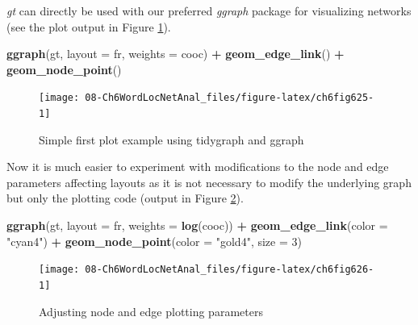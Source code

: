 \documentclass[
]{article}
\newenvironment{Shaded}{\begin{snugshade}}{\end{snugshade}}
\newcommand{\AttributeTok}[1]{\textcolor[rgb]{0.13,0.29,0.53}{#1}}
\newcommand{\DecValTok}[1]{\textcolor[rgb]{0.00,0.00,0.81}{#1}}
\newcommand{\FunctionTok}[1]{\textcolor[rgb]{0.13,0.29,0.53}{\textbf{#1}}}
\newcommand{\NormalTok}[1]{#1}
\newcommand{\SpecialCharTok}[1]{\textcolor[rgb]{0.81,0.36,0.00}{\textbf{#1}}}
\newcommand{\StringTok}[1]{\textcolor[rgb]{0.31,0.60,0.02}{#1}}
\begin{document}
\emph{gt} can directly be used with our preferred \emph{ggraph} package for visualizing networks (see the plot output in Figure \ref{fig:ch6fig625}).

\begin{Shaded}
\begin{Highlighting}[]
\FunctionTok{ggraph}\NormalTok{(gt, }\AttributeTok{layout =} \StringTok{\textquotesingle{}fr\textquotesingle{}}\NormalTok{, }\AttributeTok{weights =}\NormalTok{ cooc) }\SpecialCharTok{+} 
  \FunctionTok{geom\_edge\_link}\NormalTok{() }\SpecialCharTok{+} 
  \FunctionTok{geom\_node\_point}\NormalTok{()}
\end{Highlighting}
\end{Shaded}

\begin{figure}

{\centering \texttt{[image: 08-Ch6WordLocNetAnal\_files/figure-latex/ch6fig625-1]} 

}

\caption{Simple first plot example using tidygraph and ggraph}\label{fig:ch6fig625}
\end{figure}

Now it is much easier to experiment with modifications to the node and edge parameters affecting layouts as it is not necessary to modify the underlying graph but only the plotting code (output in Figure \ref{fig:ch6fig626}).

\begin{Shaded}
\begin{Highlighting}[]
\FunctionTok{ggraph}\NormalTok{(gt, }\AttributeTok{layout =} \StringTok{\textquotesingle{}fr\textquotesingle{}}\NormalTok{, }\AttributeTok{weights =} \FunctionTok{log}\NormalTok{(cooc)) }\SpecialCharTok{+} 
  \FunctionTok{geom\_edge\_link}\NormalTok{(}\AttributeTok{color =} \StringTok{"cyan4"}\NormalTok{) }\SpecialCharTok{+} 
  \FunctionTok{geom\_node\_point}\NormalTok{(}\AttributeTok{color =} \StringTok{"gold4"}\NormalTok{, }\AttributeTok{size =} \DecValTok{3}\NormalTok{)}
\end{Highlighting}
\end{Shaded}

\begin{figure}

{\centering \texttt{[image: 08-Ch6WordLocNetAnal\_files/figure-latex/ch6fig626-1]} 

}

\caption{Adjusting node and edge plotting parameters}\label{fig:ch6fig626}
\end{figure}
\end{document}
